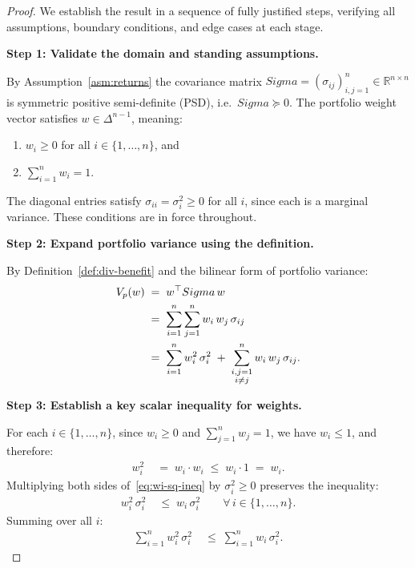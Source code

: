 \documentclass[12pt,openany]{book}
\newcommand{\R}{\mathbb{R}}
\newcommand{\bfw}{\mathbf{w}}
\newcommand{\bfSigma}{\boldsymbol{\Sigma}}
\numberwithin{equation}{chapter}
\theoremstyle{plain}
\theoremstyle{definition}
\theoremstyle{remark}
\def\bfw{w}%
\def\bfSigma{Sigma}%
\begin{document}
\begin{proof}
We establish the result in a sequence of fully justified steps,
verifying all assumptions, boundary conditions, and edge cases
at each stage.

\medskip
\noindent\textbf{Step 1: Validate the domain and standing assumptions.}

\medskip
\noindent By Assumption~\ref{asm:returns} the covariance matrix
$\bfSigma = (\sigma_{ij})_{i,j=1}^n \in \R^{n \times n}$ is
symmetric positive semi-definite (PSD), i.e.\ $\bfSigma \succeq 0$.
The portfolio weight vector satisfies $\bfw \in \Delta^{n-1}$, meaning:
\begin{enumerate}[label=(\roman*)]
  \item $w_i \geq 0$ for all $i \in \{1,\ldots,n\}$, and
  \item $\displaystyle\sum_{i=1}^n w_i = 1$.
\end{enumerate}
The diagonal entries satisfy $\sigma_{ii} = \sigma_i^2 \geq 0$ for all
$i$, since each is a marginal variance.  These conditions are in force
throughout.

\medskip
\noindent\textbf{Step 2: Expand portfolio variance using the definition.}

\medskip
\noindent By Definition~\ref{def:div-benefit} and the bilinear form of
portfolio variance:
\begin{align}
  V_p(\bfw)
  &\;=\; \bfw^\top \bfSigma\, \bfw
  \notag\\
  &\;=\; \sum_{i=1}^n \sum_{j=1}^n w_i\, w_j\, \sigma_{ij}
  \notag\\
  &\;=\; \sum_{i=1}^n w_i^2\, \sigma_i^2
         \;+\; \sum_{\substack{i,j=1\\i \neq j}}^n w_i\, w_j\, \sigma_{ij}.
  \label{eq:vp-expand}
\end{align}

\medskip
\noindent\textbf{Step 3: Establish a key scalar inequality for weights.}

\medskip
\noindent For each $i \in \{1,\ldots,n\}$, since $w_i \geq 0$ and
$\sum_{j=1}^n w_j = 1$, we have $w_i \leq 1$, and therefore:
\begin{align}
  w_i^2
  &\;=\; w_i \cdot w_i
  \;\leq\; w_i \cdot 1
  \;=\; w_i.
  \label{eq:wi-sq-ineq}
\end{align}
Multiplying both sides of~\eqref{eq:wi-sq-ineq} by
$\sigma_i^2 \geq 0$ preserves the inequality:
\begin{align}
  w_i^2\, \sigma_i^2
  &\;\leq\; w_i\, \sigma_i^2
  \qquad \forall\, i \in \{1,\ldots,n\}.
  \label{eq:wi-sq-sigma-ineq}
\end{align}
Summing over all $i$:
\begin{align}
  \sum_{i=1}^n w_i^2\, \sigma_i^2
  &\;\leq\; \sum_{i=1}^n w_i\, \sigma_i^2.
  \label{eq:diag-ineq}
\end{align}


\end{proof}
\end{document}
